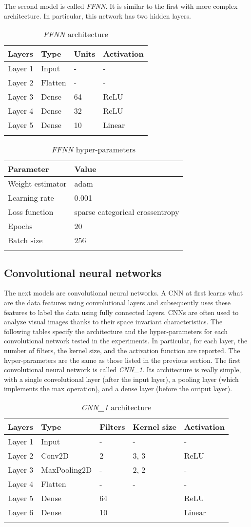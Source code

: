 \newpage

The second model is called \emph{FFNN}. It is similar to the first with
more complex architecture. In particular, this network has two hidden
layers.

\begin{longtable}[]{@{}llll@{}}
	\toprule
	\textbf{Layers} & \textbf{Type} & \textbf{Units} & \textbf{Activation}\tabularnewline
	\midrule
	\endhead
	Layer 1 & Input & - & -\tabularnewline
	Layer 2 & Flatten & - & -\tabularnewline
	Layer 3 & Dense & 64 & ReLU\tabularnewline
	Layer 4 & Dense & 32 & ReLU\tabularnewline
	Layer 5 & Dense & 10 & Linear\tabularnewline
	\bottomrule
	\caption{\emph{FFNN} architecture}
\end{longtable}

\begin{longtable}[]{@{}ll@{}}
	\toprule
	\textbf{Parameter} & \textbf{Value}\tabularnewline
	\midrule
	\endhead
	Weight estimator & adam\tabularnewline
	Learning rate & 0.001\tabularnewline
	Loss function & sparse categorical crossentropy\tabularnewline
	Epochs & 20\tabularnewline
	Batch size & 256\tabularnewline
	\bottomrule
	\caption{\emph{FFNN} hyper-parameters}
\end{longtable}

\subsection{Convolutional neural networks}\label{header-n186}

The next models are convolutional neural networks. A CNN at first
learns what are the data features using convolutional layers and
subsequently uses these features to label the data using fully
connected layers. CNNs are often used to analyze visual images thanks to
their space invariant characteristics. The following tables specify the
architecture and the hyper-parameters for each convolutional network tested in the experiments. In particular, for
each layer, the number of filters, the kernel size, and the
activation function are reported. The hyper-parameters are
the same as those listed in the previous section.
\newpage
The first convolutional neural network is called \emph{CNN\_1}. Its
architecture is really simple, with a single convolutional layer (after
the input layer), a pooling layer (which implements the max operation),
and a dense layer (before the output layer).

\begin{longtable}[]{@{}lllll@{}}
	\toprule
	\textbf{Layers} & \textbf{Type} & \textbf{Filters} & \textbf{Kernel size} &
	\textbf{Activation}\tabularnewline
	\midrule
	\endhead
	Layer 1 & Input & - & - & -\tabularnewline
	Layer 2 & Conv2D & 2 & 3, 3 & ReLU\tabularnewline
	Layer 3 & MaxPooling2D & - & 2, 2 & -\tabularnewline
	Layer 4 & Flatten & - & - & -\tabularnewline
	Layer 5 & Dense & 64 & & ReLU\tabularnewline
	Layer 6 & Dense & 10 & & Linear\tabularnewline
	\bottomrule
		\caption{\emph{CNN\_1} architecture}
\end{longtable}

